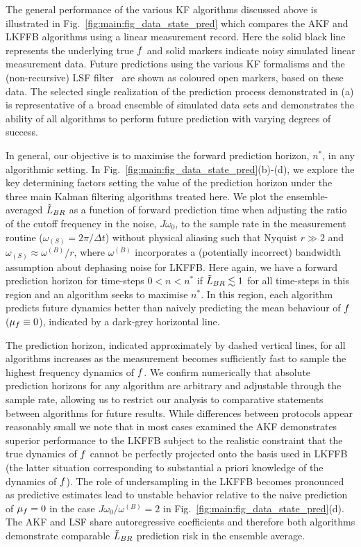 The general performance of the various KF algorithms discussed above is illustrated in Fig.~\ref{fig:main:fig_data_state_pred} which compares the AKF and LKFFB algorithms using a linear measurement record.  Here the solid black line represents the underlying true $f$ and solid markers indicate noisy simulated linear measurement data.  Future predictions using the various KF formalisms and the (non-recursive) LSF filter~\cite{mavadia2017} are shown as coloured open markers, based on these data.  The selected single realization of the prediction process demonstrated in (a) is representative of a broad ensemble of simulated data sets and demonstrates the ability of all algorithms to perform future prediction with varying degrees of success.  


In general, our objective is to maximise the forward prediction horizon, $n^{*}$, in any algorithmic setting.  In Fig.~\ref{fig:main:fig_data_state_pred}(b)-(d), we explore the key determining factors setting the value of the prediction horizon under the three main Kalman filtering algorithms treated here.  We plot the ensemble-averaged $\tilde{L}_{BR}$ as a function of forward prediction time when adjusting the ratio of the cutoff frequency in the noise, $J\omega_{0}$, to the sample rate in the measurement routine ($\omega_{(S)}=2\pi/\Delta t$) without physical aliasing such that Nyquist $r \gg2$ and $\omega_{(S)} \approx \omega^{(B)} / r$, where $\omega^{(B)}$ incorporates a (potentially incorrect) bandwidth assumption about dephasing noise for LKFFB. Here again, we have a forward prediction horizon for time-steps $0 < n < n^*$ if $\tilde{L}_{BR}\lesssim 1$ for all time-steps in this region and an algorithm seeks to maximise $n^*$. In this region, each algorithm predicts future dynamics better than naively predicting the mean behaviour of $f$ ($\mu_f \equiv 0$), indicated by a dark-grey horizontal line.

The prediction horizon, indicated approximately by dashed vertical lines, for all algorithms increases as the measurement becomes sufficiently fast to sample the highest frequency dynamics of $f$.  We confirm numerically that absolute prediction horizons for any algorithm are arbitrary and adjustable through the sample rate, allowing us to restrict our analysis to comparative statements between algorithms for future results.  While differences between protocols appear reasonably small we note that in most cases examined the AKF demonstrates superior performance to the LKFFB subject to the realistic constraint that the true dynamics of $f$ cannot be perfectly projected onto the basis used in LKFFB (the latter situation corresponding to substantial a priori knowledge of the dynamics of $f$).  The role of undersampling in the LKFFB becomes pronounced as predictive estimates lead to unstable behavior relative to the naive prediction of $\mu_f = 0$ in the case $J\omega_{0}/\omega^{(B)}=2$ in Fig.~\ref{fig:main:fig_data_state_pred}(d).  The AKF and LSF share autoregressive coefficients and therefore both algorithms demonstrate comparable $\tilde{L}_{BR}$ prediction risk in the ensemble average.

